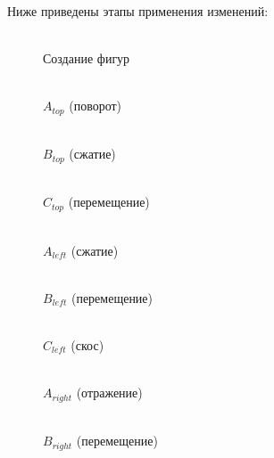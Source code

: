 \newpage
Ниже приведены этапы применения изменений:
\begin{figure}[H]
    \begin{minipage}[h]{0.27\linewidth}
        \\
        Создание фигур
    \end{minipage}
    \hfill
    \begin{minipage}[h]{0.27\linewidth}
        \\
        $A_{top}$ (поворот)
    \end{minipage}
    \hfill
    \begin{minipage}[h]{0.27\linewidth}
        \\
        $B_{top}$ (сжатие)
    \end{minipage}
    \vfill
    \vspace{12pt}
    \begin{minipage}[h]{0.27\linewidth}
        \\
        $C_{top}$ (перемещение)
    \end{minipage}
    \hfill
    \begin{minipage}[h]{0.27\linewidth}
        \\
        $A_{left}$ (сжатие)
    \end{minipage}
    \hfill
    \begin{minipage}[h]{0.27\linewidth}
        \\
        $B_{left}$ (перемещение)
    \end{minipage}
    \vfill
    \vspace{12pt}
    \begin{minipage}[h]{0.27\linewidth}
        \\
        $C_{left}$ (скос)
    \end{minipage}
    \hfill
    \begin{minipage}[h]{0.27\linewidth}
        \\
        $A_{right}$ (отражение)
    \end{minipage}
    \hfill
    \begin{minipage}[h]{0.27\linewidth}
        \\
        $B_{right}$ (перемещение)
    \end{minipage}
\end{figure}
